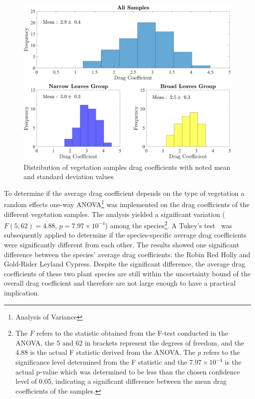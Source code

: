 \documentclass[12pt]{article}
\begin{document}
\begin{figure}[!]
\includegraphics[width=\textwidth,keepaspectratio]{Picture11.pdf}
	\caption[Distribution of drag coefficients for all samples (top), samples with narrow leaves (bottom left), samples with broad leaves (bottom right)]{Distribution of vegetation samples drag coefficients with noted mean and standard deviation values}
	\label{fig:Histogram}
\end{figure}

To determine if the average drag coefficient depends on the type of vegetation a random effects one-way ANOVA\footnote{Analysis of Variance} was implemented on the drag coefficients of the different vegetation samples. The analysis yielded a significant variation ($F(5,62)=4.88$, $p=7.97 \times 10^{-4}$) among the species\footnote{The $F$ refers to the statistic obtained from the F-test conducted in the ANOVA, the 5 and 62 in brackets represent the degrees of freedom, and the 4.88 is the actual F statistic derived from the ANOVA. The $p$ refers to the significance level determined from the F statistic and the $7.97 \times 10^{-4}$ is the actual p-value which was determined to be less than the chosen confidence level of 0.05, indicating a significant difference between the mean drag coefficients of the samples.}. A Tukey's test~\cite{Lane2010} was subsequently applied to determine if the species-specific average drag coefficients were significantly different from each other. The results showed one significant difference between the species' average drag coefficients: the Robin Red Holly and Gold-Rider Leyland Cypress. Despite the significant difference, the average drag coefficients of these two plant species are still within the uncertainty bound of the overall drag coefficient and therefore are not large enough to have a practical implication.
\end{document}
